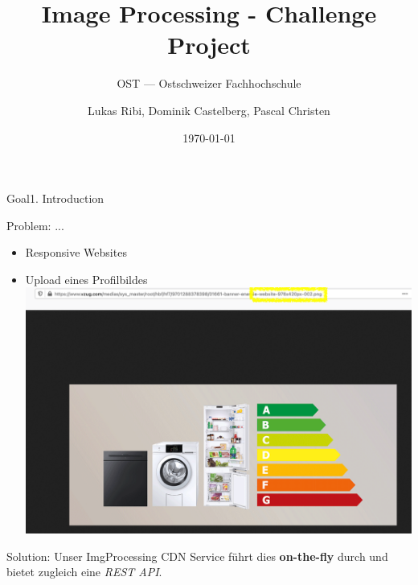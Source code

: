 \documentclass[aspectratio=169,20pt]{beamer}
\title{Image Processing - Challenge Project}
\subtitle{OST — Ostschweizer Fachhochschule}
\date{\today}
\author{Lukas Ribi, Dominik Castelberg, Pascal Christen}
\institute{DS1 - Thomas Bocek }
\begin{document}
\begin{frame}
	\titlepage
\end{frame}

\begin{frame}{Goal}{1. Introduction}
		
	Problem: ...
		
	\begin{itemize}
		\item{Responsive Websites}	
		\item{Upload eines Profilbildes}
		\includegraphics[scale=0.25]{vzug}
	\end{itemize}
		
	Solution: Unser ImgProcessing CDN Service führt dies \textbf{on-the-fly} durch und bietet zugleich eine \textit{REST API}.
		
\end{frame}
\end{document}
